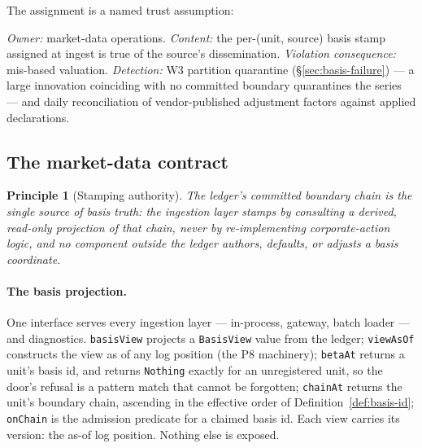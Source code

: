 \documentclass[11pt,a4paper]{article}
\newtheorem{principle}[definition]{Principle}
\begin{document}
The assignment is a named trust assumption:

\begin{description}[style=nextline]
\item[TA-BASIS.] \emph{Owner:} market-data operations. \emph{Content:} the per-(unit,
source) basis stamp assigned at ingest is true of the source's dissemination.
\emph{Violation consequence:} mis-based valuation. \emph{Detection:} W3 partition
quarantine (\S\ref{sec:basis-failure}) --- a large innovation coinciding with no
committed boundary quarantines the series --- and daily reconciliation of
vendor-published adjustment factors against applied declarations.
\end{description}

\subsection{The market-data contract}
\label{sec:basis-contract}

\begin{principle}[Stamping authority]
\label{prin:stamping-authority}
The ledger's committed boundary chain is the single source of basis truth: the
ingestion layer stamps by consulting a derived, read-only projection of that chain,
never by re-implementing corporate-action logic, and no component outside the ledger
authors, defaults, or adjusts a basis coordinate.
\end{principle}

\paragraph{The basis projection.} One interface serves every ingestion layer ---
in-process, gateway, batch loader --- and diagnostics. \texttt{basisView} projects a
\texttt{BasisView} value from the ledger; \texttt{viewAsOf} constructs the view as of
any log position (the P8 machinery); \texttt{betaAt} returns a unit's basis id, and
returns \texttt{Nothing} exactly for an unregistered unit, so the door's refusal is a
pattern match that cannot be forgotten; \texttt{chainAt} returns the unit's boundary
chain, ascending in the effective order of Definition~\ref{def:basis-id};
\texttt{onChain} is the admission predicate for a claimed basis id. Each view carries
its version: the as-of log position. Nothing else is exposed.
\end{document}
